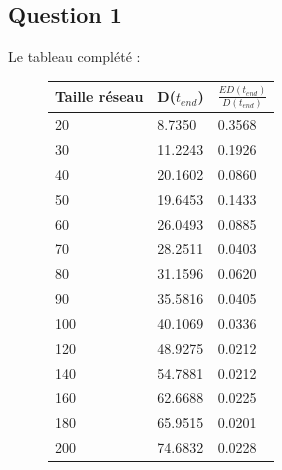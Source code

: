\documentclass[10pt]{report}
\begin{document}
\subsection{Question 1}

Le tableau complété :
\begin{figure}[h]
\begin{minipage}[b]{0.4\textwidth} \begin{flushleft}
\centering
\begin{tabular}{|l|l|l|} \hline
  Taille réseau & D($t_{end}$) & $\frac{ED(t_{end})}{D(t_{end})}$\\ \hline
	20 & 8.7350 & 0.3568\\ \hline
  	30 & 11.2243 & 0.1926\\ \hline
  	40 & 20.1602 & 0.0860\\ \hline
  	50 & 19.6453 & 0.1433\\ \hline
  	60 & 26.0493 & 0.0885\\ \hline
  	70 & 28.2511 & 0.0403\\ \hline
    80 & 31.1596 & 0.0620\\ \hline
  	90 & 35.5816 & 0.0405\\ \hline
  	100 & 40.1069 & 0.0336\\ \hline
  	120 & 48.9275 & 0.0212\\ \hline
  	140 & 54.7881 & 0.0212\\ \hline
  	160 & 62.6688 & 0.0225\\ \hline
  	180 & 65.9515 & 0.0201\\ \hline
  	200 & 74.6832 & 0.0228\\ \hline
\end{tabular}
\end{flushleft}\end{minipage}
%
\begin{minipage}{0.6\textwidth} \begin{flushright}
\vspace{-7cm}
\centering
{}
\end{flushright}
\end{minipage}
\end{figure}
\end{document}
